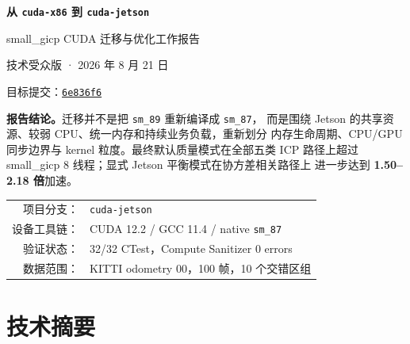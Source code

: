 \documentclass[UTF8,a4paper,11pt,fontset=none]{ctexart}
\newcommand{\metric}[1]{\textbf{\color{ReportBlue}#1}}
\newcommand{\commitid}{\texttt{6e836f6}}
\begin{document}
\hypersetup{pageanchor=false}
\begin{titlepage}
  \centering
  \vspace*{2.1cm}
  {\sffamily\bfseries\fontsize{28}{36}\selectfont\color{ReportInk}
    从 \texttt{cuda-x86} 到 \texttt{cuda-jetson}\par}
  \vspace{0.55cm}
  {\sffamily\fontsize{18}{26}\selectfont\color{ReportBlue}
    small\_gicp CUDA 迁移与优化工作报告\par}
  \vspace{1.2cm}
  {\large 技术受众版 · 2026 年 8 月 21 日\par}
  \vspace{0.35cm}
  {\normalsize 目标提交：\href{https://github.com/Functionhx/small_gicp/commit/6e836f60c04e2cf40069b25384b15764ac7757e2}{\commitid}\par}

  \vfill
  \begin{minipage}{0.88\textwidth}
    \colorbox{ReportSurface}{%
      \parbox{0.94\linewidth}{
        \vspace{0.45em}
        \textbf{报告结论。}迁移并不是把 \texttt{sm\_89} 重新编译成 \texttt{sm\_87}，
        而是围绕 Jetson 的共享资源、较弱 CPU、统一内存和持续业务负载，重新划分
        内存生命周期、CPU/GPU 同步边界与 kernel 粒度。最终默认质量模式在全部五类
        ICP 路径上超过 small\_gicp 8 线程；显式 Jetson 平衡模式在协方差相关路径上
        进一步达到 \metric{1.50--2.18 倍}加速。
        \vspace{0.45em}
      }}
  \end{minipage}
  \vfill

  \begin{tabular}{rl}
    项目分支： & \texttt{cuda-jetson} \\
    设备工具链： & CUDA 12.2 / GCC 11.4 / native \texttt{sm\_87} \\
    验证状态： & 32/32 CTest，Compute Sanitizer 0 errors \\
    数据范围： & KITTI odometry 00，100 帧，10 个交错区组
  \end{tabular}
  \vspace*{1.2cm}
\end{titlepage}

\hypersetup{pageanchor=true}
\begingroup
  \small
  \setlength{\parskip}{0pt}
  \tableofcontents
\endgroup
\clearpage
{}

\section*{技术摘要}
\end{document}
